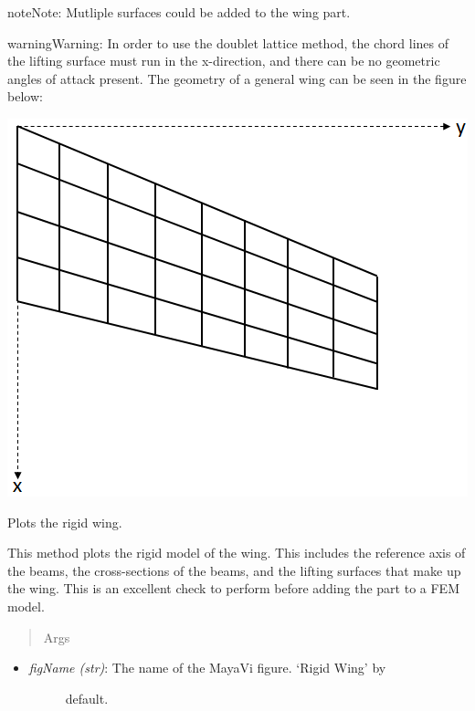 \documentclass[letterpaper,10pt,english]{sphinxmanual}
\begin{document}
\begin{fulllineitems}
\begin{fulllineitems}
\begin{itemize}
\end{itemize}

\begin{notice}{note}{Note:}
Mutliple surfaces could be added to the wing part.
\end{notice}

\begin{notice}{warning}{Warning:}
In order to use the doublet lattice method, the chord
lines of the lifting surface must run in the x-direction, and there
can be no geometric angles of attack present. The geometry of a
general wing can be seen in the figure below:
\end{notice}

{\hfill\includegraphics{DoubletLatticeWing.png}\hfill}

\end{fulllineitems}


\begin{fulllineitems}
\label{AircraftParts:AeroComBAT.AircraftParts.Wing.plotRigidWing}
Plots the rigid wing.

This method plots the rigid model of the wing. This includes the
reference axis of the beams, the cross-sections of the beams, and the
lifting surfaces that make up the wing. This is an excellent check to
perform before adding the part to a FEM model.
\begin{quote}\begin{description}
\item[{Args}] \leavevmode
\end{description}\end{quote}
\begin{itemize}
\item {} \begin{description}
\item[{\emph{figName (str)}: The name of the MayaVi figure. `Rigid Wing' by}] \leavevmode
default.


\end{description}
\end{itemize}
\end{fulllineitems}
\end{fulllineitems}
\end{document}
